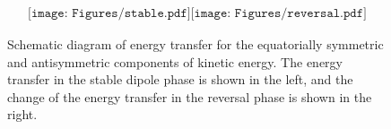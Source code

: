 \begin{figure}[ht]
\begin{center}
\[
\begin{array}{cc}
\texttt{[image: Figures/stable.pdf]}
\texttt{[image: Figures/reversal.pdf]}
\end{array}
\]
\end{center}
\caption{
Schematic diagram of energy transfer for the equatorially symmetric and antisymmetric components of kinetic energy. 
The energy transfer in the stable dipole phase is shown in the left, and the change of the energy transfer in the reversal phase is shown in the right. 
}
\label{Fig:schematic_reversal}
\end{figure}
